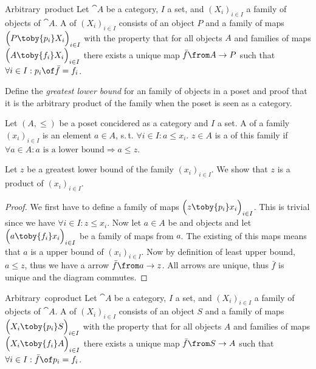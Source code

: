 
\begin{definition}{Arbitrary\ product}
  Let $\cat{A}$ be a category, $I$ a set, and $(X_i)_{i \in I}$ a family of objects of $\cat{A}$.
  A  of $(X_i)_{i \in I}$ consists of an object $P$ and a family of maps
  $\Bigl(P \toby{p_i} X_i\Bigr)_{i \in I}$
  with the property that for all objects $A$ and families of maps
  $\Bigl(A \toby{f_i} X_i\Bigr)_{i \in I}$
  there exists a unique map $\bar{f}\from A \to P$ such that
  $\forall i \in I: p_i \of \bar{f} = f_i$.
\end{definition}

\begin{exercise}
  Define the \emph{greatest lower bound} for an family of objects in a poset and proof that it is the arbitrary product of the family when the poset is seen as a category.
\end{exercise}

\begin{answer}
  Let $(A, \le)$ be a poset concidered as a category and $I$ a set.
  A  of a family $(x_i)_{i\in I}$ is an element $a \in A$, s.\,t. $\forall i \in I: a \le x_i$.
  $z \in A$ is a  of this family if $\forall a \in A: \text{$a$ is a lower bound} \Rightarrow a \le z$.

  Let $z$ be a greatest lower bound of the family $(x_i)_{i\in I}$. We show that $z$ is a product of $(x_i)_{i\in I}$.
  \begin{proof}
    We first have to define a family of maps $\Bigl(z \toby{p_i} x_i\Bigr)_{i \in I}$.
    This is trivial since we have $\forall i \in I: z \le x_i$.
    Now let $a \in A$ be and objects and let $\Bigl(a \toby{f_i} x_i\Bigr)_{i \in I}$ be a family of maps from $a$.
    The existing of this maps means that $a$ is a upper bound of $(x_i)_{i\in I}$.
    Now by definition of least upper bound, $a \le z$, thus we have a arrow $\bar{f} \from a \to z$.
    All arrows are unique, thus $\bar{f}$ is unique and the diagram commutes. \qedhere
  \end{proof}
\end{answer}

\begin{definition}{Arbitrary\ coproduct}
  Let $\cat{A}$ be a category, $I$ a set, and $(X_i)_{i \in I}$ a family of objects of $\cat{A}$.
  A  of $(X_i)_{i \in I}$ consists of an object $S$ and a family of maps
  $\Bigl(X_i \toby{p_i} S\Bigr)_{i \in I}$
  with the property that for all objects $A$ and families of maps
  $\Bigl(X_i \toby{f_i} A\Bigr)_{i \in I}$
  there exists a unique map $\bar{f}\from S \to A$ such that
  $\forall i \in I: \bar{f} \of p_i = f_i$.
\end{definition}

